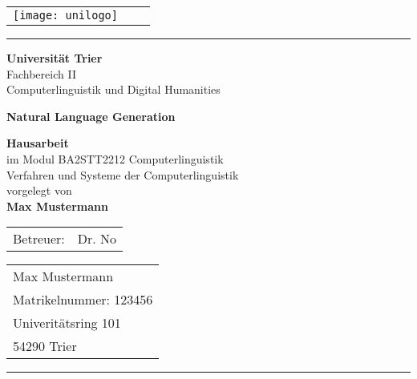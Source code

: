 
\newcommand{\trtitle}{Natural Language Generation}
\newcommand{\trtype}{Hausarbeit}
\newcommand{\trauthor}{Max Mustermann}
\newcommand{\trstrasse}{Univeritätsring 101}
\newcommand{\trmatrikelnummer}{123456}
\newcommand{\trort}{54290 Trier}
\newcommand{\trbetreuer}{Dr. No}
\newcommand{\trmodul}{BA2STT2212 Computerlinguistik}
\newcommand{\trlehrveranstaltung}{Verfahren und Systeme der Computerlinguistik}


\newcommand{\truni}{Universität Trier}
\newcommand{\trfachbereich}{Fachbereich II}
\newcommand{\trfach}{Computerlinguistik und Digital Humanities}
\newcommand{\trdate}{\today}

\thispagestyle{empty}

\begin{tabular}{lcr}
  \texttt{[image: unilogo]}
\end{tabular}

\rule{\textwidth}{0.4pt}

\begin{center}
  \textbf{\truni} \\
  \trfachbereich \\
  \trfach \\[0.5cm]
\end{center}

\vspace{2.5cm}

\begin{center}
  \textbf{\LARGE \trtitle}
\end{center}

\vspace{2cm}

\begin{center}
  \textbf{\trtype} \\
  im Modul \trmodul \\
  \trlehrveranstaltung \\[0.5cm]
  
  vorgelegt von \\
  \textbf{\trauthor}
\end{center}

\vspace{1cm}

\begin{center}
\begin{tabular}{ll}
Betreuer: & \trbetreuer \\
\end{tabular}
\end{center}

\vspace{1cm}
\vfill

\begin{tabular}{l}
\trauthor \\
Matrikelnummer:  \trmatrikelnummer \\
\trstrasse \\
\trort
\end{tabular}

\rule{\textwidth}{0.4pt}
